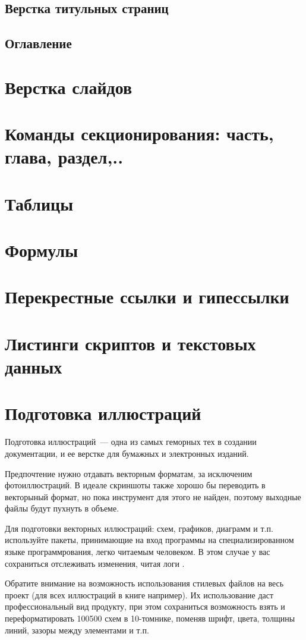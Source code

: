 \subsection{Верстка титульных страниц}
\subsection{Оглавление}
\section{Верстка слайдов}

\section{Команды секционирования: часть, глава, раздел,..}
\section{Таблицы}
\section{Формулы}
\section{Перекрестные ссылки и гипессылки}
\section{Листинги скриптов и текстовых данных}
\section{Подготовка иллюстраций}

Подготовка иллюстраций\ --- одна из самых геморных тех в создании документации,
и ее верстке для бумажных и электронных изданий.

Предпочтение нужно отдавать векторным форматам, за исключеним фотоиллюстраций.
В идеале скриншоты также хорошо бы переводить в векторыный формат, но пока
инструмент для этого не найден, поэтому выходные файлы будут пухнуть в объеме.

Для подготовки векторных иллюстраций: схем, графиков, диаграмм и т.п.
используйте пакеты, принимающие на вход программы на специализированном языке
программрования, легко читаемым человеком. В этом случае у вас сохраниться
отслеживать изменения, читая логи \vcs.

Обратите внимание на возможность использования стилевых файлов на весь проект
(для всех иллюстраций в книге например). Их использование даст профессиональный
вид продукту, при этом сохраниться возможность взять и переформатировать 100500
схем в 10-томнике, поменяв шрифт, цвета, толщины линий, зазоры между элементами
и т.п. 

